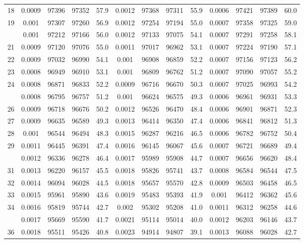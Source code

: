 \documentclass[
  14pt,
]{article}
\begin{document}
\begin{longtable}[t]{lcccccccccccc}
18 & 0.0009 & 97396 & 97352 & 57.9 & 0.0012 & 97368 & 97311 & 55.9 & 0.0006 & 97421 & 97389 & 60.0\\
19 & 0.001 & 97307 & 97260 & 56.9 & 0.0012 & 97254 & 97194 & 55.0 & 0.0007 & 97358 & 97325 & 59.0\\
\addlinespace
20 & 0.001 & 97212 & 97166 & 56.0 & 0.0012 & 97133 & 97075 & 54.1 & 0.0007 & 97291 & 97258 & 58.1\\
21 & 0.0009 & 97120 & 97076 & 55.0 & 0.0011 & 97017 & 96962 & 53.1 & 0.0007 & 97224 & 97190 & 57.1\\
22 & 0.0009 & 97032 & 96990 & 54.1 & 0.001 & 96908 & 96859 & 52.2 & 0.0007 & 97156 & 97123 & 56.2\\
23 & 0.0008 & 96949 & 96910 & 53.1 & 0.001 & 96809 & 96762 & 51.2 & 0.0007 & 97090 & 97057 & 55.2\\
24 & 0.0008 & 96871 & 96833 & 52.2 & 0.0009 & 96716 & 96670 & 50.3 & 0.0007 & 97025 & 96993 & 54.2\\
\addlinespace
25 & 0.0008 & 96795 & 96757 & 51.2 & 0.001 & 96624 & 96575 & 49.3 & 0.0006 & 96961 & 96931 & 53.3\\
26 & 0.0009 & 96718 & 96676 & 50.2 & 0.0012 & 96526 & 96470 & 48.4 & 0.0006 & 96901 & 96871 & 52.3\\
27 & 0.0009 & 96635 & 96589 & 49.3 & 0.0013 & 96414 & 96350 & 47.4 & 0.0006 & 96841 & 96812 & 51.3\\
28 & 0.001 & 96544 & 96494 & 48.3 & 0.0015 & 96287 & 96216 & 46.5 & 0.0006 & 96782 & 96752 & 50.4\\
29 & 0.0011 & 96445 & 96391 & 47.4 & 0.0016 & 96145 & 96067 & 45.6 & 0.0007 & 96721 & 96689 & 49.4\\
\addlinespace
30 & 0.0012 & 96336 & 96278 & 46.4 & 0.0017 & 95989 & 95908 & 44.7 & 0.0007 & 96656 & 96620 & 48.4\\
31 & 0.0013 & 96220 & 96157 & 45.5 & 0.0018 & 95826 & 95741 & 43.7 & 0.0008 & 96584 & 96544 & 47.5\\
32 & 0.0014 & 96094 & 96028 & 44.5 & 0.0018 & 95657 & 95570 & 42.8 & 0.0009 & 96503 & 96458 & 46.5\\
33 & 0.0015 & 95961 & 95890 & 43.6 & 0.0019 & 95483 & 95393 & 41.9 & 0.001 & 96412 & 96362 & 45.6\\
34 & 0.0016 & 95819 & 95744 & 42.7 & 0.002 & 95302 & 95208 & 41.0 & 0.0011 & 96312 & 96258 & 44.6\\
\addlinespace
35 & 0.0017 & 95669 & 95590 & 41.7 & 0.0021 & 95114 & 95014 & 40.0 & 0.0012 & 96203 & 96146 & 43.7\\
36 & 0.0018 & 95511 & 95426 & 40.8 & 0.0023 & 94914 & 94807 & 39.1 & 0.0013 & 96088 & 96028 & 42.7\\

\end{longtable}
\end{document}
